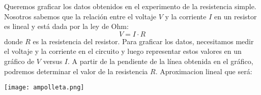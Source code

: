 Queremos graficar los datos obtenidos en el experimento de la resistencia simple.
Nosotros sabemos que la relación entre el voltaje \( V \) y la corriente \( I \)
en un resistor es lineal y está dada por la ley de Ohm:
\[
V = I \cdot R
\]
donde \( R \) es la resistencia del resistor. Para graficar los datos, necesitamos
medir el voltaje y la corriente en el circuito y luego representar estos valores
en un gráfico de \( V \) versus \( I \). A partir de la pendiente de la línea obtenida en el gráfico,
podremos determinar el valor de la resistencia \( R \). Aproximacion lineal que será:

\texttt{[image: ampolleta.png]}